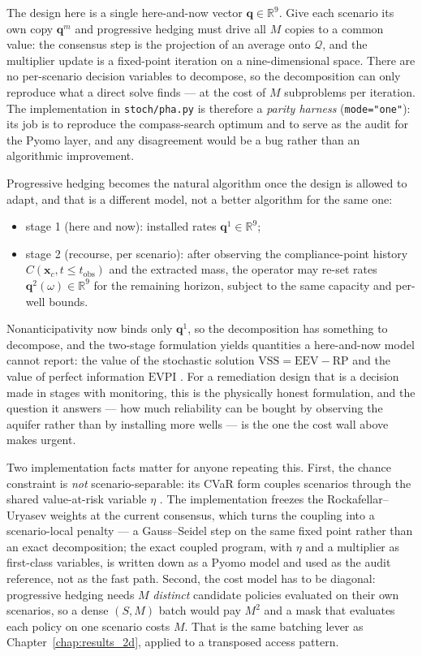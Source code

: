 The design here is a single here-and-now vector $\mathbf{q}\in\mathbb{R}^9$. Give
each scenario its own copy $\mathbf{q}^m$ and progressive hedging must drive all
$M$ copies to a common value: the consensus step is the projection of an average
onto $\mathcal{Q}$, and the multiplier update is a fixed-point iteration on a
nine-dimensional space. There are no per-scenario decision variables to
decompose, so the decomposition can only reproduce what a direct solve finds ---
at the cost of $M$ subproblems per iteration. The implementation in
\texttt{stoch/pha.py} is therefore a \emph{parity harness}
(\texttt{mode="one"}): its job is to reproduce the compass-search optimum and to
serve as the audit for the Pyomo layer, and any disagreement would be a bug
rather than an algorithmic improvement.

Progressive hedging becomes the natural algorithm once the design is allowed to
adapt, and that is a different model, not a better algorithm for the same one:
\begin{itemize}
  \item stage 1 (here and now): installed rates $\mathbf{q}^1\in\mathbb{R}^9$;
  \item stage 2 (recourse, per scenario): after observing the compliance-point
    history $C(\mathbf{x}_c,t\le t_{\text{obs}})$ and the extracted mass, the
    operator may re-set rates $\mathbf{q}^2(\omega)\in\mathbb{R}^9$ for the
    remaining horizon, subject to the same capacity and per-well bounds.
\end{itemize}
Nonanticipativity now binds only $\mathbf{q}^1$, so the decomposition has
something to decompose, and the two-stage formulation yields quantities a
here-and-now model cannot report: the value of the stochastic solution
$\mathrm{VSS}=\mathrm{EEV}-\mathrm{RP}$ and the value of perfect information
$\mathrm{EVPI}$ \citep{birge2011}. For a remediation design that is a decision
made in stages with monitoring, this is the physically honest formulation, and
the question it answers --- how much reliability can be bought by observing the
aquifer rather than by installing more wells --- is the one the cost wall above
makes urgent.

Two implementation facts matter for anyone repeating this. First, the chance
constraint is \emph{not} scenario-separable: its CVaR form couples scenarios
through the shared value-at-risk variable $\eta$ \citep{rockafellar2000}. The
implementation freezes the Rockafellar--Uryasev weights at the current consensus,
which turns the coupling into a scenario-local penalty --- a Gauss--Seidel step
on the same fixed point rather than an exact decomposition; the exact coupled
program, with $\eta$ and a multiplier as first-class variables, is written down
as a Pyomo model and used as the audit reference, not as the fast path. Second,
the cost model has to be diagonal: progressive hedging needs $M$ \emph{distinct}
candidate policies evaluated on their own scenarios, so a dense $(S,M)$ batch
would pay $M^2$ and a mask that evaluates each policy on one scenario costs $M$.
That is the same batching lever as Chapter~\ref{chap:results_2d}, applied to a
transposed access pattern.

